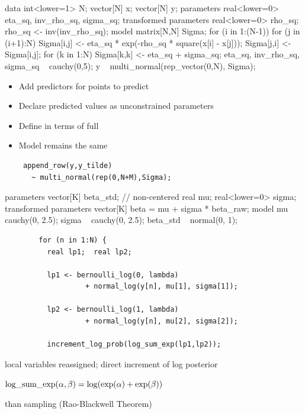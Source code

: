 \documentclass[10pt]{report}
\begin{document}
%
\vspace*{-5pt}
\begin{stancode}
data {
  int<lower=1> N;  vector[N] x; vector[N] y;
} parameters {
  real<lower=0> eta_sq, inv_rho_sq, sigma_sq;
} transformed parameters {
  real<lower=0> rho_sq; rho_sq <- inv(inv_rho_sq);
} model {
  matrix[N,N] Sigma;
  for (i in 1:(N-1)) { 
    for (j in (i+1):N) {
      Sigma[i,j] <- eta_sq * exp(-rho_sq * square(x[i] - x[j]));
      Sigma[j,i] <- Sigma[i,j];
  }}
  for (k in 1:N) Sigma[k,k] <- eta_sq + sigma_sq;
  eta_sq, inv_rho_sq, sigma_sq ~ cauchy(0,5);
  y ~ multi_normal(rep_vector(0,N), Sigma);
}
\end{stancode}


%
\begin{itemize}
\item Add predictors  for points to predict
\item Declare predicted values  as unconstrained parameters
\item Define  in terms of full 
\item Model remains the same
{\small
\begin{Verbatim}
 append_row(y,y_tilde)
   ~ multi_normal(rep(0,N+M),Sigma);
\end{Verbatim}
}
\end{itemize}


%
\begin{stancode}
parameters {
  vector[K] beta_std;  // non-centered
  real mu;
  real<lower=0> sigma;
}
transformed parameters {
  vector[K] beta = mu + sigma * beta_raw;
}
model {
  mu ~ cauchy(0, 2.5);
  sigma ~ cauchy(0, 2.5);
  beta_std ~ normal(0, 1);
}
\end{stancode}


%
{\footnotesize
\begin{Verbatim}
        for (n in 1:N) {
          real lp1;  real lp2;

          lp1 <- bernoulli_log(0, lambda)               
                   + normal_log(y[n], mu[1], sigma[1]); 

          lp2 <- bernoulli_log(1, lambda)
                   + normal_log(y[n], mu[2], sigma[2]);

          increment_log_prob(log_sum_exp(lp1,lp2));  
\end{Verbatim}
}
\vspace*{2pt}
\begin{subitemize}
\item local variables reassigned; direct increment of log posterior
\item $\mbox{\rm log\_sum\_exp}(\alpha,\beta) = \log (\exp(\alpha) + \exp(\beta))$
\item {} than sampling (Rao-Blackwell Theorem)
\vspace*{10pt}
\end{subitemize}
\end{document}
